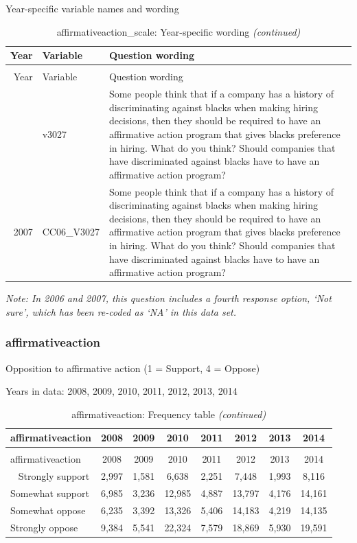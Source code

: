 \documentclass[12pt]{article}
\begin{document}
Year-specific variable names and wording

\begin{longtable}[t]{rl>{\raggedright\arraybackslash}p{10cm}}
\caption{\label{tab:unnamed-chunk-4}affirmativeaction\_scale: Year-specific wording}\\
\toprule
Year & Variable & Question wording\\
\midrule
\endfirsthead
\caption[]{affirmativeaction\_scale: Year-specific wording \textit{(continued)}}\\
\toprule
Year & Variable & Question wording\\
\midrule
\endhead
\
\endfoot
\bottomrule
\endlastfoot
2006 & v3027 & Some people think that if a company has a history of discriminating against blacks when making hiring decisions, then they should be required to have an affirmative action program that gives blacks preference in hiring.    What do you think? Should companies that have discriminated against blacks have to have an affirmative action program?\\
2007 & CC06\_V3027 & Some people think that if a company has a history of discriminating against blacks when making hiring decisions, then they should be required to have an affirmative action program that gives blacks preference in hiring. What do you think? Should companies that have discriminated against blacks have to have an affirmative action program?\\*
\end{longtable}

\emph{Note: In 2006 and 2007, this question includes a fourth response
option, `Not sure', which has been re-coded as `NA' in this data set.}

\subsubsection{affirmativeaction}\label{affirmativeaction}

Opposition to affirmative action (1 = Support, 4 = Oppose)

Years in data: 2008, 2009, 2010, 2011, 2012, 2013, 2014

\begin{longtable}[t]{lccccccc}
\caption{\label{tab:unnamed-chunk-4}affirmativeaction: Frequency table}\\
\toprule
affirmativeaction & 2008 & 2009 & 2010 & 2011 & 2012 & 2013 & 2014\\
\midrule
\endfirsthead
\caption[]{affirmativeaction: Frequency table \textit{(continued)}}\\
\toprule
affirmativeaction & 2008 & 2009 & 2010 & 2011 & 2012 & 2013 & 2014\\
\midrule
\endhead
\
\endfoot
\bottomrule
\endlastfoot
Strongly support & 2,997 & 1,581 & 6,638 & 2,251 & 7,448 & 1,993 & 8,116\\
Somewhat support & 6,985 & 3,236 & 12,985 & 4,887 & 13,797 & 4,176 & 14,161\\
Somewhat oppose & 6,235 & 3,392 & 13,326 & 5,406 & 14,183 & 4,219 & 14,135\\
Strongly oppose & 9,384 & 5,541 & 22,324 & 7,579 & 18,869 & 5,930 & 19,591\\*
\end{longtable}
\end{document}
